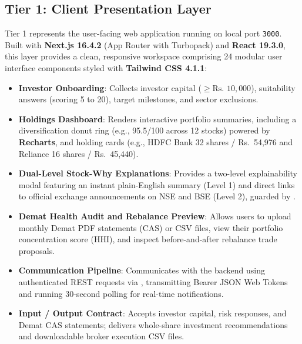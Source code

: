 \subsection{Tier 1: Client Presentation Layer}
Tier 1 represents the user-facing web application running on local port \texttt{3000}. Built with \textbf{Next.js 16.4.2} (App Router with Turbopack) and \textbf{React 19.3.0}, this layer provides a clean, responsive workspace comprising 24 modular user interface components styled with \textbf{Tailwind CSS 4.1.1}:
\begin{itemize}
    \item \textbf{Investor Onboarding}: Collects investor capital ($\ge \text{Rs.~}10{,}000$), suitability answers (scoring 5 to 20), target milestones, and sector exclusions.
    \item \textbf{Holdings Dashboard}: Renders interactive portfolio summaries, including a diversification donut ring (e.g., 95.5/100 across 12 stocks) powered by \textbf{Recharts}, and holding cards (e.g., HDFC Bank 32 shares / Rs.~54,976 and Reliance 16 shares / Rs.~45,440).
    \item \textbf{Dual-Level Stock-Why Explanations}: Provides a two-level explainability modal featuring an instant plain-English summary (Level 1) and direct links to official exchange announcements on NSE and BSE (Level 2), guarded by .
    \item \textbf{Demat Health Audit and Rebalance Preview}: Allows users to upload monthly Demat PDF statements (CAS) or CSV files, view their portfolio concentration score (HHI), and inspect before-and-after rebalance trade proposals.
    \item \textbf{Communication Pipeline}: Communicates with the backend using authenticated REST requests via , transmitting Bearer JSON Web Tokens and running 30-second polling for real-time notifications.
    \item \textbf{Input / Output Contract}: Accepts investor capital, risk responses, and Demat CAS statements; delivers whole-share investment recommendations and downloadable broker execution CSV files.
\end{itemize}

